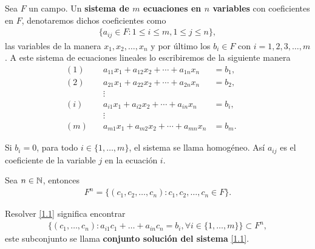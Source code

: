 \documentclass[12pt,a4paper]{book}
\begin{document}
    \begin{definicion}
    \label{def:1}
        Sea $F$ un campo. Un \textbf{sistema de $m$ ecuaciones en $n$ variables} con coeficientes en $F$, denotaremos dichos coeficientes como
        \begin{align*}
            \{a_{ij} \in F : 1 \leq i \leq m, 1 \leq j \leq n\},
        \end{align*}
        las variables de la manera $x_{1}, x_{2}, \dots , x_{n}$ y por último los $b_{i} \in F$ con $i = 1, 2, 3,\dots , m$. A este sistema de ecuaciones lineales lo escribiremos de la siguiente manera
        \begin{equation}
            \begin{alignedat}{3}
                (1)\quad & a_{11}x_{1} + a_{12}x_{2} + \cdots + a_{1n}x_{n} & =  b_{1},\\
                (2)\quad & a_{21}x_{1} + a_{22}x_{2} + \cdots + a_{2n}x_{n} & =  b_{2},\\
                &\vdots   &                                  &   &      \\
                (i)\quad & a_{i1}x_{1} + a_{i2}x_{2} + \cdots + a_{in}x_{n} & =  b_{i},\\
                &\vdots   &                                  &   &      \\
                (m)\quad & a_{m1}x_{1} + a_{m2}x_{2} + \cdots + a_{mn}x_{n} & =  b_{m}.
            \end{alignedat}
            \tag{1.1}
            \label{1.1}
        \end{equation}
    \end{definicion}
    
    Si $b_{i} = 0$, para todo $i \in \{ 1, \dots , m \}$, el sistema se llama homogéneo. Así $a_{ij}$ es el coeficiente de la variable $j$ en la ecuación $i$.
    
    Sea $n \in \mathbb{N}$, entonces
    \begin{align*}
        F^{n} = \{ (c_{1}, c_{2}, \dots , c_{n}): c_{1}, c_{2}, \dots , c_{n} \in F \}.
    \end{align*}
    
    \begin{definicion}
    \label{def:2}
        Resolver \eqref{1.1} significa encontrar
        \begin{align*}
            \{ (c_{1}, \dots , c_{n}):a_{i1}c_{1} + \dots + a_{in}c_{n} = b_{i}, \forall i \in \{1,\dots , m \}\} \subset F^{n},
        \end{align*}
        este subconjunto se llama \textbf{conjunto solución del sistema} \eqref{1.1}.
    \end{definicion}
\end{document}

